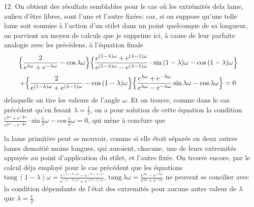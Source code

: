 \documentclass[11pt,a4paper]{article}
\begin{document}
12. On obtient des résultats semblables pour le cas où les extrémités dela lame,
aulieu d'être libres, sont l'une et l'autre fixées; car, si on suppose qu'une
telle lame soit soumise à l'action d'un stilet dans un point quelconque de
sa longueur, on parvient au moyen de calculs que je supprime ici, à cause
de leur parfaite analogie avec les précédens, à l'équation finale
\[ \Bigl\{\frac{2}{e^{\lambda\omega} + e^{-\lambda\omega}} - \text{cos}\,\lambda\omega\Bigr\}\Bigl\{\frac{e^{(1-\lambda)\omega} + e^{(\lambda-1)\omega}}{e^{(1-\lambda)\omega} - e^{(\lambda-1)\omega}}\cdot\text{sin}\,(1-\lambda)\omega - \text{cos}\,(1-\lambda)\omega\Bigr\} \]
\[ + \Bigl\{\frac{2}{e^{(1-\lambda)\omega} + e^{(\lambda-1)\omega}} - \text{cos}\,(1-\lambda)\omega\Bigr\}\Bigl\{\frac{e^{\lambda\omega} + e^{-\lambda\omega}}{e^{\lambda\omega} - e^{-\lambda\omega}}\,\text{sin}\,\lambda\omega - \text{cos}\,\lambda\omega\Bigr\} = 0 \]
delaquelle on tire les valeurs de l'angle $\omega$. Et on trouve, comme dans
le cas précédent qu'en fesant $\lambda = \frac{1}{2}$, on a pour solution de cette équation
la condition $\frac{e^{\frac{1}{2}\omega} + e^{-\frac{1}{2}\omega}}{e^{\frac{1}{2}\omega} - e^{-\frac{1}{2}\omega}}\cdot\text{sin}\,\tfrac{1}{2}\omega - \text{cos}\,\tfrac{1}{2}\omega = 0$, qui mène à conclure que


la lame primitive peut se mouvoir, comme si elle étoit séparée en deux
autres lames demoitié moins longues, qui auroient, chacune, une de leurs
extremités appuyée au point d'application du stilet, et l'autre fixée.
On trouve encore, par le calcul déja employé pour le cas précédent que
les équations $\text{tang}\,(1-\lambda)\omega = \frac{e^{(1-\lambda)\omega} - e^{(\lambda-1)\omega}}{e^{(1-\lambda)\omega} + e^{(\lambda-1)\omega}}$, $\text{tang}\,\lambda\omega = \frac{e^{\lambda\omega} - e^{-\lambda\omega}}{e^{\lambda\omega} + e^{-\lambda\omega}}$ ne peuvent
se concilier avec la condition dépendante de l'état des extremités pour
aucune autre valeur de $\lambda$ que $\lambda = \frac{1}{2}$.
\end{document}
